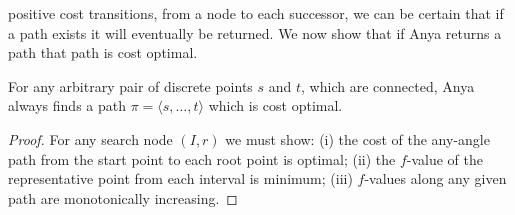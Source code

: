positive cost transitions, from a node to each successor, we can be certain that
if a path exists it will eventually be returned. We now show that if Anya returns
a path that path is cost optimal.
\begin{theorem}
For any arbitrary pair of discrete points $s$ and $t$, which are connected,
Anya always finds a path $\pi = \langle s, \ldots, t\rangle$ which is
cost optimal.
\end{theorem}
\begin{proof}
For any search node $(I, r)$ we must show: (i) the cost of the any-angle path 
from the start point to each root point is optimal; (ii) the $f$-value
of the representative point from each interval is minimum; (iii)
$f$-values along any given path are monotonically increasing.
%
%
%
%
%
%
%
%
%
% 
%
%

\end{proof}
